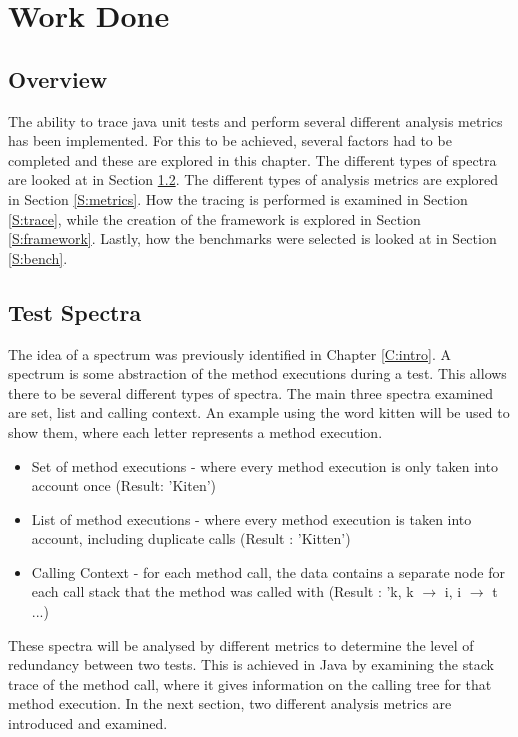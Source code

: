 \chapter{Work Done}\label{C:workdone}

\section{Overview}

The ability to trace java unit tests and perform several different analysis metrics has been implemented. For this to be achieved, several factors had to be completed and these are explored in this chapter. The different types of spectra are looked at in Section \ref{S:spectra}. The different types of analysis metrics are explored in Section \ref{S:metrics}. How the tracing is performed is examined in Section \ref{S:trace}, while the creation of the framework is explored in Section \ref{S:framework}. Lastly, how the benchmarks were selected is looked at in Section \ref{S:bench}.

\section{Test Spectra}
\label{S:spectra}

The idea of a spectrum was previously identified in Chapter \ref{C:intro}. A spectrum is some abstraction of the method executions during a test. This allows there to be several different types of spectra. The main three spectra examined are set, list and calling context. An example using the word kitten will be used to show them, where each letter represents a method execution.

\begin{itemize}
\item Set of method executions - where every method execution is only taken into account once (Result: 'Kiten')
\item List of method executions - where every method execution is taken into account, including duplicate calls (Result : 'Kitten')
\item Calling Context - for each method call, the data contains a separate node for each call stack that the method was called with \cite{callingcontext} (Result : 'k, k $\rightarrow$ i, i $\rightarrow$ t ...) 
\end{itemize}
These spectra will be analysed by different metrics to determine the level of redundancy between two tests. This is achieved in Java by examining the stack trace of the method call, where it gives information on the calling tree for that method execution. In the next section, two different analysis metrics are introduced and examined.

